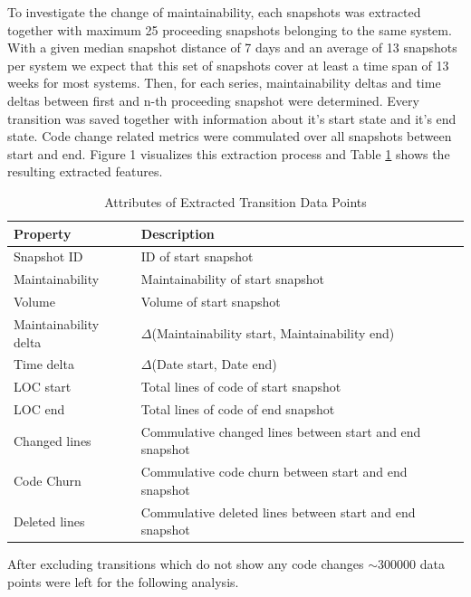 To investigate the change of maintainability, each snapshots was extracted together with maximum 25 proceeding snapshots belonging to the same system. With a given median snapshot distance of 7 days and an average of 13 snapshots per system we expect that this set of snapshots cover at least a time span of 13 weeks for most systems. Then, for each series, maintainability deltas and time deltas between first and n-th proceeding snapshot were determined. Every transition was saved together with information about it's start state and it's end state. Code change related metrics were commulated over all snapshots between start and end. Figure 1 visualizes this extraction process and Table \ref{data_points} shows the resulting extracted features.
\begin{table}[htbp!]
\caption{Attributes of Extracted Transition Data Points}
\begin{tabular}{l  p{5.2cm}}
  \hline			
  Property & Description \\ \hline
  Snapshot ID & ID of start snapshot \\
  Maintainability & Maintainability of start snapshot\\ 
  Volume & Volume of start snapshot\\ 
  Maintainability delta & \(\Delta\)(Maintainability start, Maintainability end)\\
  Time delta & \(\Delta\)(Date start, Date end)\\
  LOC start & Total lines of code of start snapshot\\ 
  LOC end & Total lines of code of end snapshot\\ 
  Changed lines & Commulative changed lines between start and end snapshot \\
  Code Churn & Commulative code churn between start and end snapshot \\ 
  Deleted lines & Commulative deleted lines between start and end snapshot \\ \hline
\end{tabular}
\label{data_points}
\end{table}

After excluding transitions which do not show any code changes $\sim$300000 data points were left for the following analysis.

